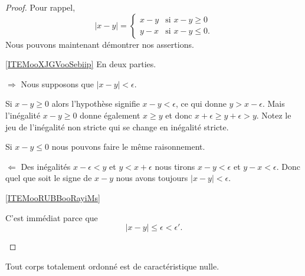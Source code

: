 \begin{proof}
    Pour rappel,
    \begin{equation}
        | x-y |=\begin{cases}
               x-y    &     \text{si } x-y\geq 0 \\
                    y-x    &    \text{si } x-y\leq 0.
               \end{cases}
    \end{equation}
    Nous pouvons maintenant démontrer nos assertions.
    \begin{subproof}
        \item[\ref{ITEMooXJGVooSebiip}]
            En deux parties.
            \begin{subproof}
            \item[\( \Rightarrow\)]
            Nous supposons que \( | x-y |<\epsilon\).

            Si \( x-y\geq 0\) alors l'hypothèse signifie \( x-y<\epsilon\), ce qui donne \( y>x-\epsilon\). Mais l'inégalité \( x-y\geq 0\) donne également \( x\geq y\) et donc \( x+\epsilon\geq y+\epsilon>y\). Notez le jeu de l'inégalité non stricte qui se change en inégalité stricte.

            Si \( x-y\leq 0\) nous pouvons faire le même raisonnement.

            \item[\( \Leftarrow\)]
            Des inégalités \( x-\epsilon<y\) et \( y<x+\epsilon\) nous tirons \( x-y<\epsilon\) et \( y-x<\epsilon\). Donc quel que soit le signe de \( x-y\) nous avons toujours \( | x-y |<\epsilon\).
            \end{subproof}

        \item[\ref{ITEMooRUBBooRayiMs}]

            C'est immédiat parce que
            \begin{equation}
                | x-y |\leq \epsilon<\epsilon'.
            \end{equation}
    \end{subproof}
\end{proof}


\begin{lemma}       \label{LEMooVZNCooRJatKK}
    Tout corps totalement ordonné est de caractéristique nulle.
\end{lemma}

